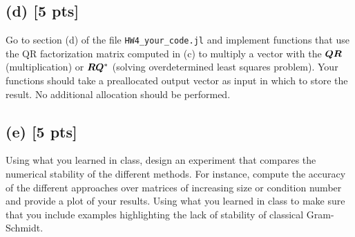 \documentclass[twoside,10pt]{article}
\begin{document}
\subsection*{(d) [5 pts]}
Go to section (d) of the file \texttt{HW4\_your\_code.jl} and implement functions that use the QR factorization matrix computed in (c) to multiply a vector with the $\bm{Q} \bm{R}$ (multiplication) or $\bm{R}\bm{Q}^*$ (solving overdetermined least squares problem). 
Your functions should take a preallocated output vector as input in which to store the result. 
No additional allocation should be performed. 


\subsection*{(e) [5 pts]}
Using what you learned in class, design an experiment that compares the numerical stability of the different methods. 
For instance, compute the accuracy of the different approaches over matrices of increasing size or condition number and provide a plot of your results.
Using what you learned in class to make sure that you include examples highlighting the lack of stability of classical Gram-Schmidt.
\end{document}
